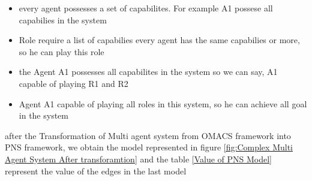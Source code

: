\begin{itemize}

\newcommand{\localtextbulletone}{\textcolor{gray}{\raisebox{.45ex}{\rule{.6ex}{.6ex}}}}
\renewcommand{\labelitemi}{\localtextbulletone}
	\item every agent possesses a set of capabilites. For example A1 possese all capabilies in the system
	\item Role require a list of capabilies every agent has the same capabilies or more, so he can play this role 
	\item the Agent A1 possesses all capabilites in the system so we can say, A1 capable of playing R1 and R2
	\item Agent A1 capable of playing all roles in this system, so he can achieve all goal in the system
\end{itemize}
\vspace{0.7cm}
after the Transformation of Multi agent system from OMACS framework into PNS framework, we obtain the model represented in figure \ref{fig:Complex Multi Agent System After transforamtion} 
and the table \ref{Value of PNS Model} represent the value of the edges in the last model 


